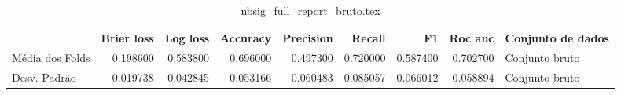 \begin{table}
\centering
\caption{nbsig_full_report_bruto.tex}
\label{nbsig_full_report_bruto.tex}
\begin{tabular}{lrrrrrrrl}
\toprule
{} &  Brier  loss &  Log loss &  Accuracy  &  Precision  &   Recall  &       F1  &  Roc auc  & Conjunto de dados \\
\midrule
Média dos Folds &     0.198600 &  0.583800 &   0.696000 &    0.497300 &  0.720000 &  0.587400 &  0.702700 &    Conjunto bruto \\
Desv. Padrão    &     0.019738 &  0.042845 &   0.053166 &    0.060483 &  0.085057 &  0.066012 &  0.058894 &    Conjunto bruto \\
\bottomrule
\end{tabular}
\end{table}
